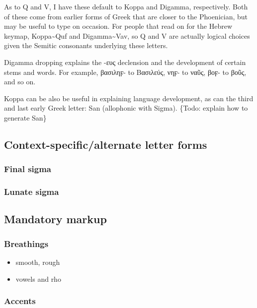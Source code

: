 \documentclass[11pt]{article}
\begin{document}
\begin{enumerate}
As to Q and V, I have these default to Koppa and Digamma, respectively. Both of these come from earlier forms of Greek that are closer to the Phoenician, but may be useful to type on occasion. For people that read on for the Hebrew keymap, Koppa\textasciitilde{}Quf and Digamma\textasciitilde{}Vav, so Q and V are actually logical choices given the Semitic consonants underlying these letters.

Digamma dropping explains the -ευς declension and the development of certain stems and words. For example, βασιληϝ- to Βασιλεύς, νηϝ- to ναῦς, βοϝ- to βοῦς, and so on.

Koppa can be also be useful in explaining language development, as can the third and last early Greek letter: San (allophonic with Sigma). \{Todo: explain how to generate San\}
\end{enumerate}

\subsection{Context-specific/alternate letter forms}
\label{sec:orge59d773}

\subsubsection{Final sigma}
\label{sec:org7637cee}

\subsubsection{Lunate sigma}
\label{sec:org86d90b8}

\subsection{Mandatory markup}
\label{sec:orgaf93adb}

\subsubsection{Breathings}
\label{sec:org2f63be5}

\begin{itemize}
\item smooth, rough
\item vowels and rho
\end{itemize}

\subsubsection{Accents}
\label{sec:org6fd3db1}
\end{document}
